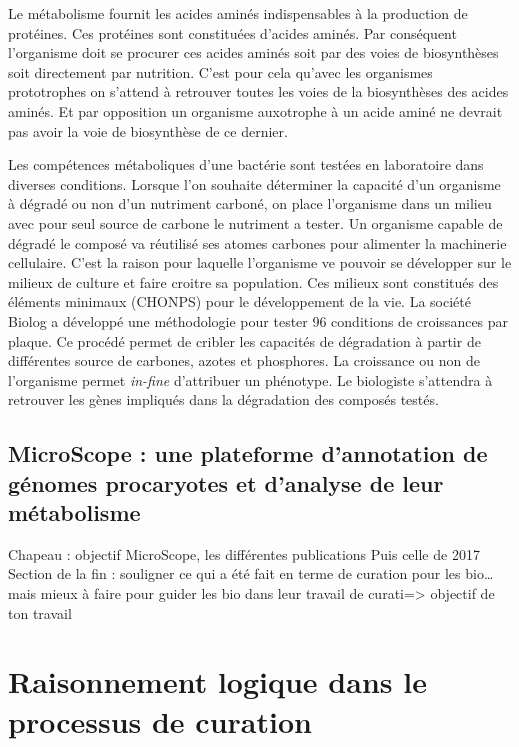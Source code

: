 \begin{refsegment}
    Le métabolisme fournit les acides aminés indispensables à la production de protéines. Ces protéines sont constituées d’acides aminés. Par conséquent l’organisme doit se procurer ces acides aminés soit par des voies de biosynthèses soit directement par nutrition. C’est pour cela qu’avec les organismes prototrophes on s’attend à retrouver toutes les voies de la biosynthèses des acides aminés. Et par opposition un organisme auxotrophe à un acide aminé ne devrait pas avoir la voie de biosynthèse de ce dernier.
    
    Les compétences métaboliques d'une bactérie sont testées en laboratoire dans diverses conditions. Lorsque l'on souhaite déterminer la capacité d'un organisme à dégradé ou non d'un nutriment carboné, on place l'organisme dans un milieu avec pour seul source de carbone le nutriment a tester. Un organisme capable de dégradé le composé va réutilisé ses atomes carbones pour alimenter la machinerie cellulaire. C'est la raison pour laquelle l'organisme ve pouvoir se développer sur le milieux de culture et faire croitre sa population. Ces milieux sont constitués des éléments minimaux (\gls{CHONPS}) pour le développement de la vie. La société Biolog \cite{bochner2009global} a développé une méthodologie pour tester 96 conditions de croissances par plaque. Ce procédé permet de cribler les capacités de dégradation à partir de différentes source de carbones, azotes et phosphores. La croissance ou non de l'organisme permet \textit{in-fine} d'attribuer un phénotype. Le biologiste s'attendra à retrouver les gènes impliqués dans la dégradation des composés testés.
    
    \subsection{MicroScope : une plateforme d’annotation de génomes procaryotes et d’analyse de leur métabolisme}
    
    Chapeau : objectif MicroScope, les différentes publications
    Puis celle de 2017
    Section de la fin : souligner ce qui a été fait en terme de curation pour les bio… mais mieux à faire pour guider les bio dans leur travail de curati=> objectif de ton travail
    
    

    \section{Raisonnement logique dans le processus de curation}
    

\end{refsegment}
